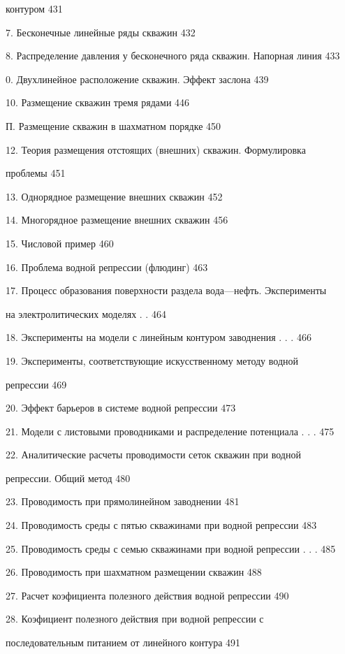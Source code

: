 \documentclass[
  11pt,
]{article}
\begin{document}
контуром 431 \par
7. Бесконечные линейные ряды скважин 432 \par
8. Распределение давления у бесконечного ряда скважин. Напорная линия 433 \par
0. Двухлинейное расположение скважин. Эффект заслона 439 \par
10. Размещение скважин тремя рядами 446 \par
П. Размещение скважин в шахматном порядке 450 \par
12. Теория размещения отстоящих (внешних) скважин. Формулировка  \par
проблемы 451 \par
13. Однорядное размещение внешних скважин 452 \par
14. Многорядное размещение внешних скважин 456 \par
15. Числовой пример 460 \par
16. Проблема водной репрессии (флюдинг) 463 \par
17. Процесс образования поверхности раздела вода---нефть. Эксперименты \par
на электролитических моделях . . 464 \par
18. Эксперименты на модели с линейным контуром заводнения . . . 466 \par
19. Эксперименты, соответствующие искусственному методу водной  \par
репрессии 469 \par
20. Эффект барьеров в системе водной репрессии 473 \par
21. Модели с листовыми проводниками и распределение потенциала . . . 475 \par
22. Аналитические расчеты проводимости сеток скважин при водной  \par
репрессии. Общий метод 480 \par
23. Проводимость при прямолинейном заводнении 481 \par
24. Проводимость среды с пятью скважинами при водной репрессии 483 \par
25. Проводимость среды с семью скважинами при водной репрессии . . . 485 \par
26. Проводимость при шахматном размещении скважин 488 \par
27. Расчет коэфициента полезного действия водной репрессии 490 \par
28. Коэфициент полезного действия при водной репрессии с  \par
последовательным питанием от линейного контура 491 \par
\end{document}
